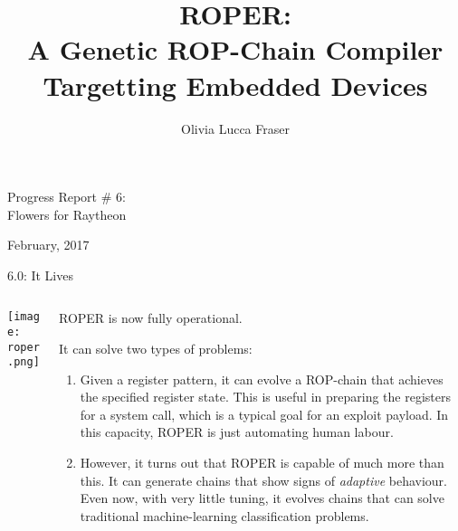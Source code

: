 \documentclass[9pt]{beamer}
\title{ROPER:\\A Genetic ROP-Chain Compiler Targetting Embedded Devices}
\author{Olivia Lucca Fraser}
\institute{NIMS Lab, Dalhousie University}
\begin{document}
\maketitle

\begin{frame}
\begin{center}    
    {\huge Progress Report \# 6:\\Flowers for Raytheon}
    \vspace{.3cm}
    
    {\large February, 2017}
    \end{center} 
    
\end{frame}

\begin{frame}{6.0: It Lives}
\begin{columns}
\begin{column}{.4\textwidth}
    \texttt{[image: roper.png]}
\end{column}
\begin{column}{.6\textwidth}

ROPER is now fully operational.

\vspace{.25cm}

It can solve two types of problems:
    \vspace{.3cm}
    \begin{enumerate}
        \item Given a register pattern, it can evolve a ROP-chain that achieves the specified register state. This is useful in preparing the registers for a system call, which is a typical goal for an exploit payload. In this capacity, ROPER is just automating human labour.
        \vspace{.3cm}
        \item However, it turns out that ROPER is capable of much more than this. It can generate chains that show signs of \emph{adaptive} behaviour. Even now, with very little tuning, it evolves chains that can solve traditional machine-learning classification problems.
    \end{enumerate}

\end{column}



\end{columns}
    
\end{frame}
\end{document}
